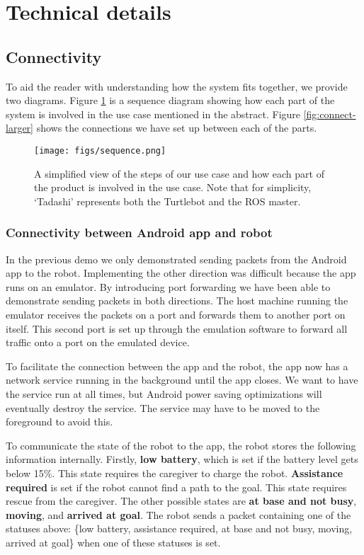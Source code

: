 \documentclass{article}
\begin{document}
\section{Technical details}
\subsection{Connectivity}
To aid the reader with understanding how the system fits together, we provide two diagrams. Figure \ref{fig:seq} is a sequence diagram showing how each part of the system is involved in the use case mentioned in the abstract. Figure \ref{fig:connect-larger} shows the connections we have set up between each of the parts. 

\begin{figure}
  \begin{center}
    \texttt{[image: figs/sequence.png]}
  \end{center}
  \caption{A simplified view of the steps of our use case and how each part of the product is involved in the use case. Note that for simplicity, `Tadashi' represents both the Turtlebot and the ROS master.}
  \label{fig:seq}
\end{figure}

\subsubsection{Connectivity between Android app and robot}
\label{approbot}
In the previous demo we only demonstrated sending packets from the Android app to the robot. Implementing the other direction was difficult because the app runs on an emulator. By introducing port forwarding we have been able to demonstrate sending packets in both directions. The host machine running the emulator receives the packets on a port and forwards them to another port on itself. This second port is set up through the emulation software to forward all traffic onto a port on the emulated device.

To facilitate the connection between the app and the robot, the app now has a network service running in the background until the app closes. We want to have the service run at all times, but Android power saving optimizations will eventually destroy the service. The service may have to be moved to the foreground to avoid this. 

To communicate the state of the robot to the app, the robot stores the following information internally. Firstly, {\bf low battery}, which is set if the battery level gets below 15\%. This state requires the caregiver to charge the robot. {\bf Assistance required} is set if the robot cannot find a path to the goal. This state requires rescue from the caregiver. The other possible states are {\bf at base and not busy}, {\bf moving}, and {\bf arrived at goal}. The robot sends a packet containing one of the statuses above: \{low battery, assistance required, at base and not busy, moving, arrived at goal\} when one of these statuses is set. 
\end{document}
